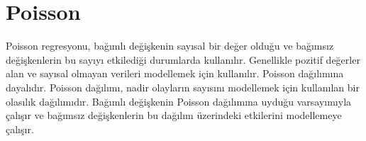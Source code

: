 \section{Poisson}
Poisson regresyonu, bağımlı değişkenin sayısal bir değer olduğu ve bağımsız değişkenlerin bu sayıyı etkilediği durumlarda kullanılır. Genellikle pozitif değerler alan ve sayısal olmayan verileri modellemek için kullanılır. Poisson dağılımına dayalıdır. Poisson dağılımı, nadir olayların sayısını modellemek için kullanılan bir olasılık dağılımıdır. Bağımlı değişkenin Poisson dağılımına uyduğu varsayımıyla çalışır ve bağımsız değişkenlerin bu dağılım üzerindeki etkilerini modellemeye çalışır.

\newpage